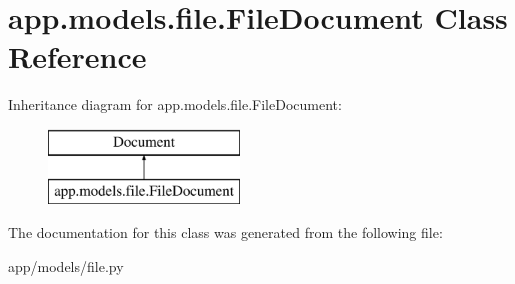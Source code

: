 \hypertarget{classapp_1_1models_1_1file_1_1_file_document}{}\section{app.\+models.\+file.\+File\+Document Class Reference}
\label{classapp_1_1models_1_1file_1_1_file_document}
Inheritance diagram for app.\+models.\+file.\+File\+Document\+:\begin{figure}[H]
\begin{center}
\leavevmode
\includegraphics[height=2.000000cm]{classapp_1_1models_1_1file_1_1_file_document}
\end{center}
\end{figure}


The documentation for this class was generated from the following file\+:\begin{DoxyCompactItemize}
\item 
app/models/file.\+py\end{DoxyCompactItemize}
